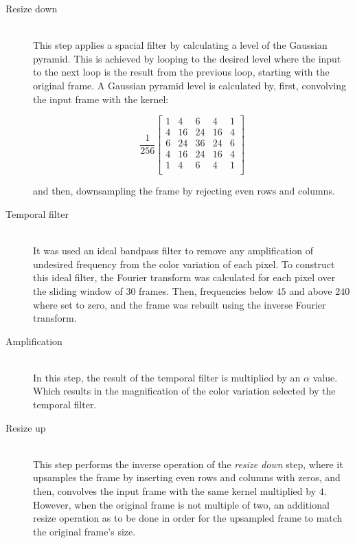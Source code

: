 \begin{description}
  \item[Resize down]\hfill\\
        This step applies a spacial filter by calculating a level of the
        Gaussian pyramid. This is achieved by looping to the desired
        level where the input to the next loop is the result from the previous
        loop, starting with the original frame. A Gaussian pyramid level is
        calculated by, first, convolving the input frame with the kernel:

        \begin{equation}
          \frac{1}{256}
          \begin{bmatrix}
             1 &  4 &  6 &  4 &  1 \\
             4 & 16 & 24 & 16 &  4 \\
             6 & 24 & 36 & 24 &  6 \\
             4 & 16 & 24 & 16 &  4 \\
             1 &  4 &  6 &  4 &  1 \\
          \end{bmatrix}
        \end{equation}

        and then, downsampling the frame by rejecting even rows and columns.

  \item[Temporal filter]\hfill\\
        It was used an ideal bandpass filter to remove any amplification of
        undesired frequency from the color variation of each pixel.
        To construct this ideal filter, the Fourier transform was calculated
        for each pixel over the sliding window of $30$ frames. Then,
        frequencies below $45$ and above $240$ where set to zero, and the frame
        was rebuilt using the inverse Fourier transform.

  \item[Amplification]\hfill\\
        In this step, the result of the temporal filter is multiplied by an
        $\alpha$ value. Which results in the magnification of the color
        variation selected by the temporal filter.

  \item[Resize up]\hfill\\
        This step performs the inverse operation of the \emph{resize down} step,
        where it upsamples the frame by inserting even rows and columns with
        zeros, and then, convolves the input frame with the same kernel
        multiplied by $4$. However, when the original frame is not multiple of
        two, an additional resize operation as to be done in order for the
        upsampled frame to match the original frame's size.
\end{description}

